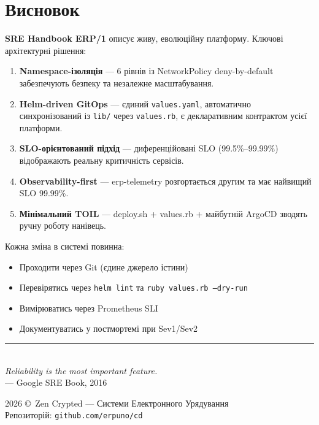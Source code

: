 \documentclass[12pt,a4paper]{article}
\begin{document}
\newpage
\section{Висновок}

\textbf{SRE Handbook ERP/1} описує живу, еволюційну платформу.
Ключові архітектурні рішення:

\begin{enumerate}[leftmargin=1.5cm]
  \item \textbf{Namespace-ізоляція} --- 6 рівнів із NetworkPolicy deny-by-default
    забезпечують безпеку та незалежне масштабування.
  \item \textbf{Helm-driven GitOps} --- єдиний \texttt{values.yaml},
    автоматично синхронізований із \texttt{lib/} через \texttt{values.rb},
    є декларативним контрактом усієї платформи.
  \item \textbf{SLO-орієнтований підхід} --- диференційовані SLO
    (99.5\%--99.99\%) відображають реальну критичність сервісів.
  \item \textbf{Observability-first} --- erp-telemetry розгортається другим
    та має найвищий SLO 99.99\%.
  \item \textbf{Мінімальний TOIL} --- deploy.sh + values.rb + майбутній ArgoCD
    зводять ручну роботу нанівець.
\end{enumerate}

\vspace{20pt}

Кожна зміна в системі повинна:
\begin{itemize}[leftmargin=1.5cm]
  \item Проходити через Git (єдине джерело істини)
  \item Перевірятись через \texttt{helm lint} та \texttt{ruby values.rb --dry-run}
  \item Вимірюватись через Prometheus SLI
  \item Документуватись у постмортемі при Sev1/Sev2
\end{itemize}

\vspace{30pt}
\begin{center}
\textcolor{primary}{\rule{12cm}{0.6pt}}\\[12pt]
{\large\color{primary}\itshape \guillemotleft Reliability is the most important feature.\guillemotright}\\[6pt]
{\normalsize\color{footergray} --- Google SRE Book, 2016}
\end{center}

\vfill
\begin{flushright}
{\small\color{footergray} 2026 \copyright\ Zen Crypted --- Системи Електронного Урядування\\
Репозиторій: \texttt{github.com/erpuno/cd}}
\end{flushright}
\end{document}
